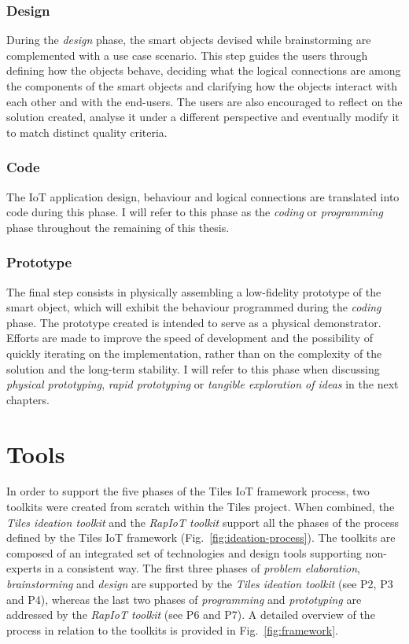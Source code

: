 \subsubsection{Design}
During the \textit{design} phase, the smart objects devised while brainstorming are complemented with a use case scenario. This step guides the users through defining how the objects behave, deciding what the logical connections are among the components of the smart objects and clarifying how the objects interact with each other and with the end-users. The users are also encouraged to reflect on the solution created, analyse it under a different perspective and eventually modify it to match distinct quality criteria.

\subsubsection{Code}
The IoT application design, behaviour and logical connections are translated into code during this phase. I will refer to this phase as the \textit{coding} or \textit{programming} phase throughout the remaining of this thesis.

\subsubsection{Prototype}
The final step consists in physically assembling a low-fidelity prototype of the smart object, which will exhibit the behaviour programmed during the \textit{coding} phase. The prototype created is intended to serve as a physical demonstrator. Efforts are made to improve the speed of development and the possibility of quickly iterating on the implementation, rather than on the complexity of the solution and the long-term stability. I will refer to this phase when discussing \textit{physical prototyping}, \textit{rapid prototyping} or \textit{tangible exploration of ideas} in the next chapters.


\section{Tools}
\label{sec:tools}

In order to support the five phases of the Tiles IoT framework process, two toolkits were created from scratch within the Tiles project. When combined, the \textit{Tiles ideation toolkit} and the \textit{RapIoT toolkit} support all the phases of the process defined by the Tiles IoT framework (Fig.~\ref{fig:ideation-process}). The toolkits are composed of an integrated set of technologies and design tools supporting non-experts in a consistent way. The first three phases of \textit{problem elaboration}, \textit{brainstorming} and \textit{design} are supported by the \textit{Tiles ideation toolkit} (see P2, P3 and P4), whereas the last two phases of \textit{programming} and \textit{prototyping} are addressed by the \textit{RapIoT toolkit} (see P6 and P7). A detailed overview of the process in relation to the toolkits is provided in Fig.~\ref{fig:framework}.

